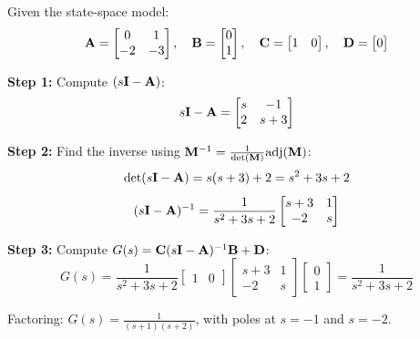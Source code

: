 \begin{examplebox}[title=Example 4.5: State-Space to Transfer Function Conversion]
Given the state-space model:
\begin{equation}
\mathbf{A} = \begin{bmatrix} 0 & 1 \\ -2 & -3 \end{bmatrix}, \quad
\mathbf{B} = \begin{bmatrix} 0 \\ 1 \end{bmatrix}, \quad
\mathbf{C} = \begin{bmatrix} 1 & 0 \end{bmatrix}, \quad
\mathbf{D} = \begin{bmatrix} 0 \end{bmatrix}
\end{equation}

\textbf{Step 1:} Compute $(s\mathbf{I} - \mathbf{A})$:
\begin{equation}
s\mathbf{I} - \mathbf{A} = \begin{bmatrix} s & -1 \\ 2 & s+3 \end{bmatrix}
\end{equation}

\textbf{Step 2:} Find the inverse using $\mathbf{M}^{-1} = \frac{1}{\det(\mathbf{M})}\text{adj}(\mathbf{M})$:
\begin{equation}
\det(s\mathbf{I} - \mathbf{A}) = s(s+3) + 2 = s^2 + 3s + 2
\end{equation}
\begin{equation}
(s\mathbf{I} - \mathbf{A})^{-1} = \frac{1}{s^2 + 3s + 2}\begin{bmatrix} s+3 & 1 \\ -2 & s \end{bmatrix}
\end{equation}

\textbf{Step 3:} Compute $G(s) = \mathbf{C}(s\mathbf{I} - \mathbf{A})^{-1}\mathbf{B} + \mathbf{D}$:
\begin{equation}
G(s) = \frac{1}{s^2 + 3s + 2}\begin{bmatrix} 1 & 0 \end{bmatrix}\begin{bmatrix} s+3 & 1 \\ -2 & s \end{bmatrix}\begin{bmatrix} 0 \\ 1 \end{bmatrix} = \frac{1}{s^2 + 3s + 2}
\end{equation}

Factoring: $G(s) = \frac{1}{(s+1)(s+2)}$, with poles at $s = -1$ and $s = -2$.
\end{examplebox}

